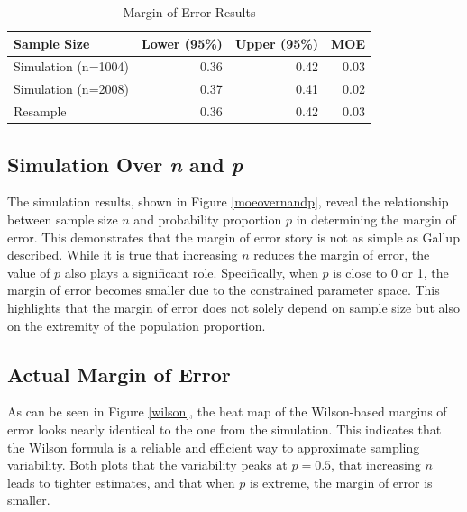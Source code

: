 \documentclass{article}\usepackage[]{graphicx}\usepackage[]{xcolor}
\begin{document}
\begin{multicols}{2}
\begin{table}[H]
\centering
\begingroup\small
\begin{tabular}{lrrr}
  \hline
Sample Size & Lower (95\%) & Upper (95\%) & MOE \\ 
  \hline
Simulation (n=1004) & 0.36 & 0.42 & 0.03 \\ 
  Simulation (n=2008) & 0.37 & 0.41 & 0.02 \\ 
  Resample & 0.36 & 0.42 & 0.03 \\ 
   \hline
\end{tabular}
\endgroup
\caption{Margin of Error Results} 
\label{resultstable}
\end{table}


\columnbreak
\subsection{Simulation Over \textit{n} and \textit{p}}
The simulation results, shown in Figure \ref{moeovernandp}, reveal the relationship 
between sample size $n$ and probability proportion $p$ in determining the margin
of error. This demonstrates that the margin of error story is not as simple as 
Gallup described. While it is true that increasing $n$ reduces the margin of error,
the value of $p$ also plays a significant role. Specifically, when $p$ is close to 
0 or 1, the margin of error becomes smaller due to the constrained parameter space.
This highlights that the margin of error does not solely depend on sample size but
also on the extremity of the population proportion. 

\subsection{Actual Margin of Error}
As can be seen in Figure \ref{wilson}, the heat map of the Wilson-based margins
of error looks nearly identical to the one from the simulation. This indicates that the Wilson formula is a reliable and efficient way to approximate sampling variability. Both plots that the variability peaks at $p=0.5$, that increasing $n$ leads to tighter 
estimates, and that when $p$ is extreme, the margin of error is smaller.



\end{multicols}
\end{document}
